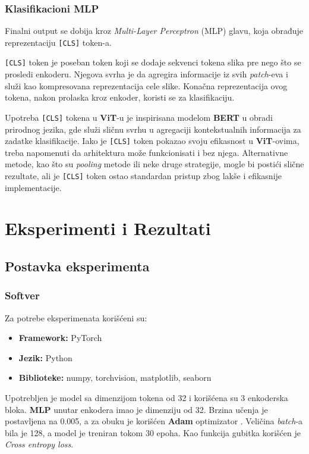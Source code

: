 \documentclass[12pt]{article}
\begin{document}
   \newpage
   \subsubsection{Klasifikacioni MLP}
   Finalni output se dobija kroz \textit{Multi-Layer Perceptron} (MLP) glavu, koja 
   obrađuje reprezentaciju \texttt{[CLS]} token-a.

   \texttt{[CLS]} token je poseban token koji se dodaje sekvenci tokena slika pre 
   nego što se prosledi enkoderu. Njegova svrha je da agregira informacije iz svih 
   \textit{patch}-eva i služi kao kompresovana reprezentacija cele slike. Konačna 
   reprezentacija ovog tokena, nakon prolaska kroz enkoder, koristi se za 
   klasifikaciju.

   Upotreba \texttt{[CLS]} tokena u \textbf{ViT}-u je inspirisana modelom \textbf{BERT} 
   \cite{bert} u obradi prirodnog jezika, gde služi sličnu svrhu u agregaciji kontekstualnih 
   informacija za zadatke klasifikacije. Iako je \texttt{[CLS]} token pokazao svoju efikasnost u 
   \textbf{ViT}-ovima, treba napomenuti da arhitektura može funkcionisati i bez njega. 
   Alternativne metode, kao što su \textit{pooling} metode ili neke druge strategije, mogle 
   bi postići slične rezultate, ali je \texttt{[CLS]} token ostao standardan pristup zbog lakše i efikasnije
   implementacije.

   \section{Eksperimenti i Rezultati}
   \subsection{Postavka eksperimenta}
   \subsubsection{Softver}
   Za potrebe eksperimenata korišćeni su:
   \begin{itemize}
      \vspace{-0.5cm}
      \setlength\itemsep{0.2em} %
      \item \textbf{Framework:} PyTorch
      \item \textbf{Jezik:} Python
      \item \textbf{Biblioteke:} numpy, torchvision, matplotlib, seaborn
   \end{itemize}
   Upotrebljen je model sa dimenzijom tokena od 32 i 
   korišćena su 3 enkoderska bloka. \textbf{MLP} unutar enkodera imao je dimenziju 
   od 32. Brzina učenja je postavljena na 0.005, a za obuku je korišćen \textbf{Adam} 
   optimizator \cite{adam}. Veličina \textit{batch}-a bila je 128, a model je 
   treniran tokom 30 epoha. Kao funkcija gubitka korišćen je \textit{Cross entropy loss}.
\end{document}

